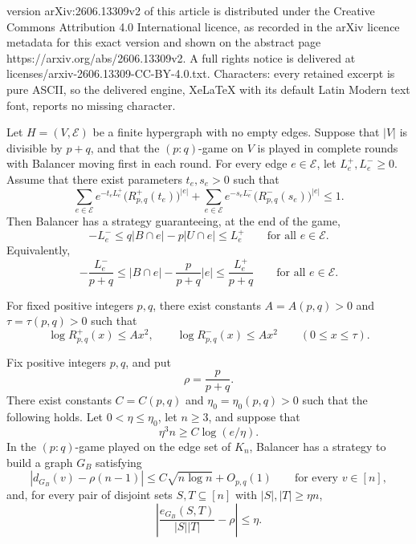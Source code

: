 \documentclass[10pt,a4paper]{amsart}
\begin{document}
version arXiv:2606.13309v2 of this article is distributed under the Creative Commons Attribution 4.0 International licence, as recorded in the arXiv licence metadata for this exact version and shown on the abstract page https://arxiv.org/abs/2606.13309v2. A full rights notice is delivered at licenses/arxiv-2606.13309-CC-BY-4.0.txt. Characters: every retained excerpt is pure ASCII, so the delivered engine, XeLaTeX with its default Latin Modern text font, reports no missing character.
\begin{theorem}
\label{thm:main}
Let $H=(V,\mathcal E)$ be a finite hypergraph with no empty edges. Suppose that $|V|$ is divisible by $p+q$, and that the $(p:q)$-game on $V$ is played in complete rounds with Balancer moving first in each round. For every edge $e\in\mathcal E$, let $L_e^+,L_e^-\ge0$. Assume that there exist parameters $t_e,s_e>0$ such that
\begin{equation}
\label{eq:main-condition}
        \sum_{e\in\mathcal E} e^{-t_eL_e^+}
        \bigl(R^+_{p,q}(t_e)\bigr)^{|e|}
        +
        \sum_{e\in\mathcal E} e^{-s_eL_e^-}
        \bigl(R^-_{p,q}(s_e)\bigr)^{|e|}
        \le 1.
\end{equation}
Then Balancer has a strategy guaranteeing, at the end of the game,
\[
        -L_e^-\le q|B\cap e|-p|U\cap e|\le L_e^+
        \qquad\text{for all }e\in\mathcal E.
\]
Equivalently,
\[
        -\frac{L_e^-}{p+q}\le
        |B\cap e|-\frac{p}{p+q}|e|\le
        \frac{L_e^+}{p+q}
        \qquad\text{for all }e\in\mathcal E.
\]
\end{theorem}

\begin{lemma}\label{lem:local-quadratic}
For fixed positive integers $p,q$, there exist constants
$A=A(p,q)>0$ and $\tau=\tau(p,q)>0$ such that
\[
        \log R^+_{p,q}(x)\le A x^2,
        \qquad
        \log R^-_{p,q}(x)\le A x^2
        \qquad(0\le x\le \tau).
\]
\end{lemma}

\begin{theorem}\label{thm:pseudorandom}
Fix positive integers $p,q$, and put
\[
        \rho=\frac{p}{p+q}.
\]
There exist constants $C=C(p,q)$ and $\eta_0=\eta_0(p,q)>0$ such that the
following holds. Let $0<\eta\le\eta_0$, let $n\ge3$, and suppose that
\[
        \eta^3 n\ge C\log(e/\eta).
\]
In the $(p:q)$-game played on the edge set of $K_n$, Balancer has a strategy
to build a graph $G_B$ satisfying
\[
        \left|d_{G_B}(v)-\rho(n-1)\right|
        \le
        C\sqrt{n\log n}+O_{p,q}(1)
        \qquad\text{for every }v\in[n],
\]
and, for every pair of disjoint sets $S,T\subseteq[n]$ with
$|S|,|T|\ge\eta n$,
\[
        \left|
        \frac{e_{G_B}(S,T)}{|S||T|}-\rho
        \right|
        \le \eta .
\]
\end{theorem}
\end{document}
